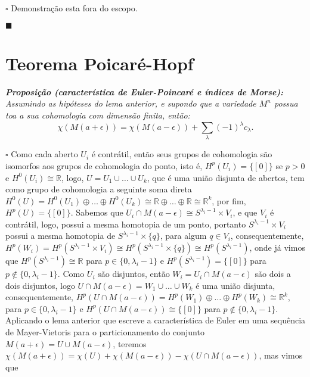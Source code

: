 \documentclass{article}
\begin{document}
	$\square$ Demonstração esta fora do escopo.
	
	$\blacksquare$
	
	\section{Teorema Poicaré-Hopf}
	
	\vspace{2mm}
	\textit{\textbf{Proposição (característica de Euler-Poincaré e índices de Morse):} Assumindo as hipóteses do lema anterior, e supondo que a variedade $M^{n}$ possua toa a sua cohomologia com dimensão finita, então:}
	$$
	\chi(M(a+\epsilon)) = \chi(M(a-\epsilon)) + \sum_{\lambda}(-1)^{\lambda}c_{\lambda}.
	$$
	
	$\square$ Como cada aberto $U_{i}$ é contrátil, então seus grupos de cohomologia são isomorfos aos grupos de cohomologia do ponto, isto é, $H^{p}(U_{i})  = \{[0]\}$ se $p > 0$ e $H^{0}(U_{i}) \cong \mathbb{R}$, logo, $U = U_{1} \cup \dots \cup U_{k}$, que é uma união disjunta de abertos, tem como grupo de cohomologia a seguinte soma direta $H^{0}(U) = H^{0}(U_{1}) \oplus \dots \oplus H^{0}(U_{k}) \cong \mathbb{R} \oplus \dots \oplus \mathbb{R} \cong \mathbb{R}^{k}$, por fim, $H^{p}(U) = \{[0]\}$. Sabemos que $U_{i} \cap M(a-\epsilon) \cong S^{\lambda_{i} - 1} \times V_{i}$, e que $V_{i}$ é contrátil, logo, possui a mesma homotopia de um ponto, portanto $S^{\lambda_{i} - 1} \times V_{i}$ possui a mesma homotopia de $S^{\lambda_{i} - 1} \times \{q\}$, para algum $q \in V_{i}$, consequentemente, $H^{p}(W_{i}) = H^{p}(S^{\lambda_{i} - 1} \times V_{i}) \cong H^{p}(S^{\lambda_{i} - 1} \times \{q\}) \cong H^{p}(S^{\lambda_{i} - 1})$, onde já vimos que $H^{p}(S^{\lambda_{i} - 1}) \cong \mathbb{R}$ para $p \in \{0, \lambda_{i} - 1\}$ e $H^{p}(S^{\lambda_{i} - 1}) = \{[0]\}$ para $p \notin \{0, \lambda_{i} - 1\}$. Como $U_{i}$ são disjuntos, então $W_{i} = U_{i}\cap M(a-\epsilon)$ são dois a dois disjuntos, logo $U \cap M(a-\epsilon) = W_{1} \cup \dots \cup W_{k}$ é uma união disjunta, consequentemente, $H^{p}(U \cap M(a-\epsilon)) = H^{p}(W_{1}) \oplus \dots \oplus H^{p}(W_{k}) \cong \mathbb{R}^{k}$, para $p \in \{0, \lambda_{i} - 1\}$ e $H^{p}(U \cap M(a-\epsilon)) \cong \{[0]\}$ para $p \notin \{0, \lambda_{i} - 1\}$. Aplicando o lema anterior que escreve a característica de Euler em uma sequência de Mayer-Vietoris para o particionamento do conjunto $M(a+\epsilon) = U \cup M(a-\epsilon)$, teremos $\chi(M(a+\epsilon)) = \chi(U) + \chi(M(a-\epsilon)) - \chi(U \cap M(a-\epsilon))$, mas vimos que 
\end{document}
